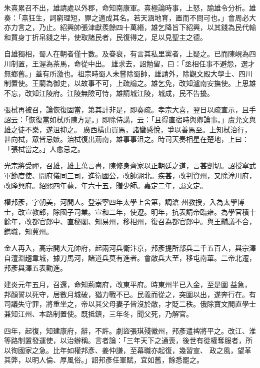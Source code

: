 \begin{pinyinscope}
 朱熹累召不出，雄請處以外郡，命知南康軍。熹極論時事，上怒，諭雄令分析。雄奏：「熹狂生，詞窮理短，罪之適成其名。若天涵地育，置而不問可也。」會周必大亦力言之，乃止。紹興帥張津獻羨餘四十萬緡，雄乞降旨下紹興，以其錢為民代輸和買身丁折帛錢之半，使取諸民者，民復得之，足以見聖主之德。



 自雄獨相，蜀人在朝者僅十數。及眷衰，有言其私里黨者，上疑之。已而陳峴為四川制置，王渥為茶馬，命從中出。
 雄求去，詔勉留，曰：「丞相任事不避怨，選才無鄉舊。」蓋有所激也。祖宗時蜀人未嘗除蜀帥，雄請外，除觀文殿大學士、四川制置使。王藺為御史，以故事不可，上疏論之。雄乞免，改知瀘南安撫使。上思雄不忘，改知江陵府。江陵無險可恃，雄請城江陵，城成，民不告擾。



 張栻再被召，論恢復固當，第其計非是，即奏疏。孝宗大喜，翌日以疏宣示，且手詔云：「恢復當如栻所陳方是。」即除侍講，云：「且得直宿時與卿論事。」虞允文與雄之徒不樂，遂沮抑之。
 廣西橫山買馬，諸蠻感悅，爭以善馬至。上知栻治行，甚向栻，眾皆忌嫉。洎栻復出荊南，雄事事沮之。時司天奏相星在楚地，上曰：「張栻當之。」人愈忌之。



 光宗將受禪，召雄，雄上萬言書，陳修身齊家以正朝廷之道，言甚剴切。詔授寧武軍節度使、開府儀同三司，進衛國公，改帥湖北。疾甚，改判資州，又除潼川府，改隆興府。紹熙四年薨，年六十五，贈少師。嘉定二年，謚文定。



 權邦彥，字朝美，河間人。登崇寧四年太學上舍第，調滄
 州教授，入為太學博士，改宣教郎，除國子司業。宣和二年，使遼。明年，抗表請帝臨雍。為學官積十餘年，改都官郎中、直秘閣、知易州，移相州，復召為都官郎中。與王黼議不合，鐫職，知冀州。



 金人再入，高宗開大元帥府，起兩河兵衛汴京，邦彥提所部兵二千五百人，與宗澤自澶淵趨韋城，據刀馬河，諸道兵莫有進者。會敵兵大至，移屯南華。二帝北遷，邦彥與澤五表勸進。



 建炎元年五月，召還，命知荊南府，改東平府。時東州半已入金，至是圍
 益急，邦顏誓以死守，居數月城破，猶力戰不已。民義而從之，突圍以出，遂奔行在。有司議失守罪，將重坐之，帝以其父母妻子皆沒於敵，才貶二秩。俄除寶文閣直學士兼知江州、本路制置使。既抵鎮，三年冬，聞父死，乃解官。



 四年，起復，知建康府，辭，不許。劇盜張琪殘徽州，邦彥遣裨將平之。改江、淮等路制置發運使，以治辦稱。言者論：「三年天下之通喪，後世有從權奪服者，所以徇國家之急。比年如權邦彥、姜仲謙，至幕職亦起復，幾習宣、
 政之風，望革其弊，以明人倫、厚風俗。」詔邦彥任軍賦，宜如舊，餘悉罷之。




\end{pinyinscope}
